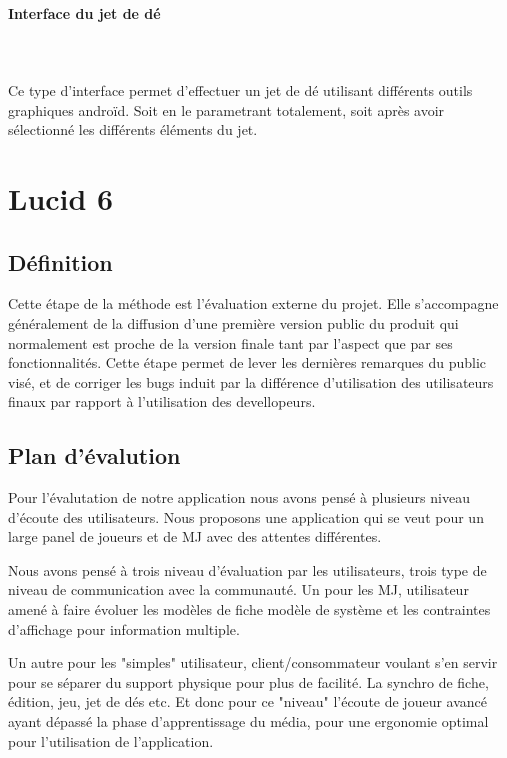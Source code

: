 \documentclass[11pt,a4paper]{article}
\begin{document}
\paragraph{Interface du jet de dé}
~\\
~\\
Ce type d'interface permet d'effectuer un jet de dé utilisant différents outils
graphiques androïd. Soit en le parametrant totalement, soit après avoir
sélectionné les différents éléments du jet.

\section{Lucid 6}

\subsection{Définition}

Cette étape de la méthode est l'évaluation externe du projet. Elle s'accompagne
généralement de la diffusion d'une première version public du produit qui
normalement est proche de la version finale tant par l'aspect que par ses
fonctionnalités.
Cette étape permet de lever les dernières remarques du public visé, et de
corriger les bugs induit par la différence d'utilisation des utilisateurs finaux
par rapport à l'utilisation des devellopeurs.


\subsection{Plan d'évalution}

Pour l'évalutation de notre application nous avons pensé à plusieurs niveau d'écoute
des utilisateurs. Nous proposons une application qui se veut pour un large panel 
de joueurs et de MJ avec des attentes différentes.

Nous avons pensé à trois niveau d'évaluation par les utilisateurs, trois type de niveau de communication
 avec la communauté. Un pour les MJ, utilisateur amené à faire évoluer les modèles de fiche modèle de système
et les contraintes d'affichage pour information multiple.

Un autre pour les "simples" utilisateur, client/consommateur voulant s'en servir pour se séparer
du support physique pour plus de facilité. La synchro de fiche, édition, jeu, jet de dés etc.
Et donc pour ce "niveau" l'écoute de joueur avancé ayant dépassé la phase d'apprentissage 
du média, pour une ergonomie optimal pour l'utilisation de l'application. 
\end{document}
